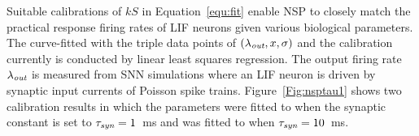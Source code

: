 	\DIFaddend Suitable calibrations of \DIFaddbegin {}\DIFaddend $k$\DIFdelbegin {}\DIFdelend \DIFaddbegin {}\DIFaddend $S$ in Equation~\ref{equ:fit} enable NSP to closely match the practical response firing rates of LIF neurons given various biological parameters.
	The \DIFdelbegin {}\DIFdelend \DIFaddbegin {}\DIFaddend curve-fitted with the triple data points of $(\lambda_{\textit{\textrm{out}}}, x, \sigma)$ and the calibration currently is conducted by linear least squares regression.
	The output firing rate $\lambda_{\textit{\textrm{out}}}$ is measured from SNN simulations where an LIF neuron is driven by synaptic input currents of Poisson spike trains\DIFaddbegin {}\DIFaddend . 
	Figure~\ref{Fig:nsptau1} shows two calibration results in which the parameters were fitted to \DIFdelbegin {}\DIFdelend \DIFaddbegin {}\DIFaddend when the synaptic constant is set to $\tau_{\textit{\textrm{syn}}}=1$~ms and was fitted to \DIFdelbegin {}\DIFdelend \DIFaddbegin {}\DIFaddend when $\tau_{\textit{\textrm{syn}}}=10$~ms.

